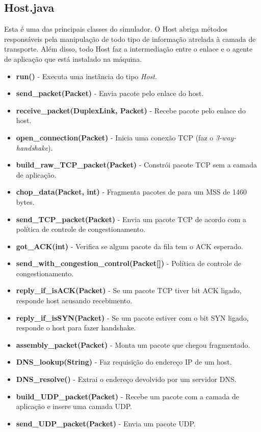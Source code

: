 \documentclass[11pt]{article}
\begin{document}
\subsection{Host.java}
Esta é uma das principais classes do simulador. O Host abriga métodos responsáveis pela manipulação de todo tipo de informação atrelada à camada de transporte. Além disso, todo Host faz a intermediação entre o enlace e o agente de aplicação que está instalado na máquina.

\begin{itemize}
	\item \textbf{run()} - Executa uma instância do tipo \textit{Host}.
	\item \textbf{send\_packet(Packet)} - Envia pacote pelo enlace do host.
	\item \textbf{receive\_packet(DuplexLink, Packet)} - Recebe pacote pelo enlace do host.
	\item \textbf{open\_connection(Packet)} - Inicia uma conexão TCP (faz o \textit{3-way-handshake}).
	\item \textbf{build\_raw\_TCP\_packet(Packet)} - Constrói pacote TCP sem a camada de aplicação.
	\item \textbf{chop\_data(Packet, int)} - Fragmenta pacotes de para um MSS de 1460 bytes.
	\item \textbf{send\_TCP\_packet(Packet)} - Envia um pacote TCP de acordo com a política de controle de congestionamento.
	\item \textbf{got\_ACK(int)} - Verifica se algum pacote da fila tem o ACK esperado.
	\item \textbf{send\_with\_congestion\_control(Packet[])} - Política de controle de congestionamento.
	\item \textbf{reply\_if\_isACK(Packet)} - Se um pacote TCP tiver bit ACK ligado, responde host acusando recebimento.
	\item \textbf{reply\_if\_isSYN(Packet)} - Se um pacote estiver com o bit SYN ligado, responde o host para fazer handshake.
	\item \textbf{assembly\_packet(Packet)} - Monta um pacote que chegou fragmentado.
	\item \textbf{DNS\_lookup(String)} - Faz requisição do endereço IP de um host.
	\item \textbf{DNS\_resolve()} - Extrai o endereço devolvido por um servidor DNS.
	\item \textbf{build\_UDP\_packet(Packet)} - Recebe um pacote com a camada de aplicação e insere uma camada UDP.
	\item \textbf{send\_UDP\_packet(Packet)} - Envia um pacote UDP.
\end{itemize}
\end{document}
